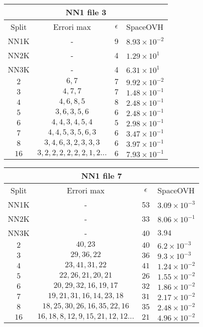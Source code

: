 \documentclass[]{article}
\begin{document}
	\begin{center}
		\begin{tabular}{|c | c | c | l|}
		
		\multicolumn{4}{c}{NN1 file 3} \\
			\hline
			Split & Errori max & $\epsilon$ & SpaceOVH \\ \hline
			 NN1K & - & 9 & $8.93 \times 10^{-2}$\\ 
			 NN2K & - & 4 & $1.29\times 10^{1}$ \\
			 NN3K & - & 4 &  $6.31\times 10^{1}$ \\
			 \hline
			 $2$ & $6, 7$ & $7$ & $9.92\times 10^{-2}$ \\ 
			 $3$ & $4, 7, 7$ & $7$ & $1.48\times 10^{-1}$ \\ 
			 $4$ & $4, 6, 8, 5$ & $8$ & $2.48\times 10^{-1}$ \\ 
			 $5$ & $3, 6, 3, 5, 6$ & $6$ & $2.48\times 10^{-1}$ \\ 
			 $6$ & $4, 4, 3, 4, 5, 4$ & $5$ & $2.98\times 10^{-1}$ \\ 
			 $7$ & $4, 4, 5, 3, 5, 6, 3$ & $6$ & $3.47\times 10^{-1}$ \\ 
			 $8$ & $3, 4, 6, 3, 2, 3, 3, 3$ & $6$ & $3.97\times 10^{-1}$ \\
			 $16$ & $3, 2, 2, 2, 2, 2, 2, 1, 2...$ & $6$ & $7.93\times 10^{-1}$ \\
			\hline  
	
		\end{tabular}
		
		\vspace*{0.5 cm}
	

	
		\begin{tabular}{| c | c | c | l |}
		
		\multicolumn{4}{c}{NN1 file 7} \\
		\hline
		Split & Errori max & $\epsilon$ & SpaceOVH \\ \hline
		NN1K & - & 53 & $3.09 \times 10^{-3}$ \\ 
		NN2K & - & 33 & $8.06 \times 10^{-1}$\\
		NN3K & - & 40 & $3.94$\\
		\hline
		$2$ & $40, 23$ & $40$ & $6.2\times 10^{-3}$ \\ 
		$3$ & $29, 36, 22$ & $36$ & $9.3\times 10^{-3}$ \\ 
		$4$ & $23, 41, 31, 22$ & $41$ & $1.24\times 10^{-2}$ \\ 
		$5$ & $22, 26, 21, 20, 21$ & $26$ & $1.55 \times 10^{-2}$ \\ 
		$6$ & $20, 29, 32, 16, 19, 17$ & $32$ & $1.86\times 10^{-2}$ \\ 
		$7$ & $19, 21, 31, 16, 14, 23, 18$ & $31$ & $2.17\times 10^{-2}$ \\ 
		$8$ & $18, 25, 30, 26, 16, 35, 22, 16$ & $35$ & $2.48\times 10^{-2}$ \\
		$16$ & $16, 18, 8, 12, 9, 15, 21, 12, 12...$ & $21$ & $4.96\times 10^{-2}$ \\ 
		

\end{tabular}
\end{center}
\end{document}
